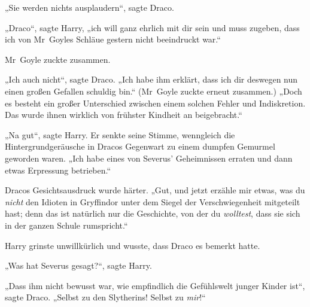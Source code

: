 „Sie werden nichts ausplaudern“, sagte Draco.

„Draco“, sagte Harry, „ich will ganz ehrlich mit dir sein und muss zugeben, dass ich von Mr~Goyles Schläue gestern nicht beeindruckt war.“

Mr~Goyle zuckte zusammen.

„Ich auch nicht“, sagte Draco. „Ich habe ihm erklärt, dass ich dir deswegen nun einen großen Gefallen schuldig bin.“ (Mr~Goyle zuckte erneut zusammen.) „Doch es besteht ein großer Unterschied zwischen einem solchen Fehler und Indiskretion. Das wurde ihnen wirklich von frühster Kindheit an beigebracht.“

„Na gut“, sagte Harry. Er senkte seine Stimme, wenngleich die Hintergrundgeräusche in Dracos Gegenwart zu einem dumpfen Gemurmel geworden waren. „Ich habe eines von Severus’ Geheimnissen erraten und dann etwas Erpressung betrieben.“

Dracos Gesichtsausdruck wurde härter. „Gut, und jetzt erzähle mir etwas, was du \emph{nicht} den Idioten in Gryffindor unter dem Siegel der Verschwiegenheit mitgeteilt hast; denn das ist natürlich nur die Geschichte, von der du \emph{wolltest}, dass sie sich in der ganzen Schule rumspricht.“

Harry grinste unwillkürlich und wusste, dass Draco es bemerkt hatte.

„Was hat Severus gesagt?“, sagte Harry.

„Dass ihm nicht bewusst war, wie empfindlich die Gefühlswelt junger Kinder ist“, sagte Draco. „Selbst zu den Slytherins! Selbst zu \emph{mir}!“


